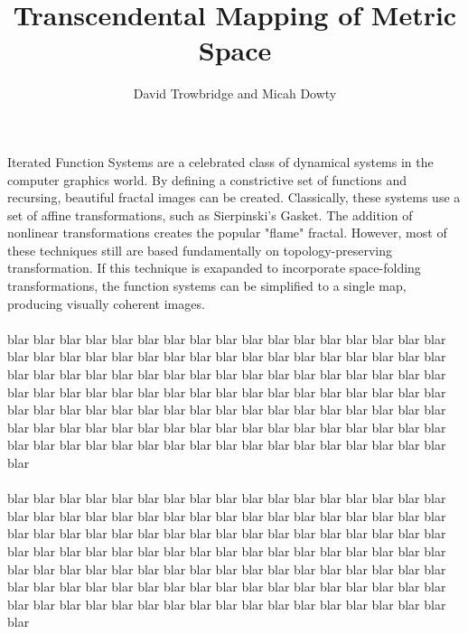 \documentclass[twocolumn]{article}
\title{Transcendental Mapping of Metric Space}
\author{David Trowbridge and Micah Dowty}
\begin{document}
\maketitle

\paragraph*{}
Iterated Function Systems are a celebrated class of dynamical systems in the
computer graphics world. By defining a constrictive set of functions and
recursing, beautiful fractal images can be created. Classically, these
systems use a set of affine transformations, such as Sierpinski's Gasket.
The addition of nonlinear transformations creates the popular "flame"
fractal. However, most of these techniques still are based fundamentally
on topology-preserving transformation. If this technique is exapanded to
incorporate space-folding transformations, the function systems can be
simplified to a single map, producing visually coherent images.

\paragraph*{}
blar blar blar blar blar blar blar blar blar blar blar blar blar blar blar
blar blar blar blar blar blar blar blar blar blar blar blar blar blar blar
blar blar blar blar blar blar blar blar blar blar blar blar blar blar blar
blar blar blar blar blar blar blar blar blar blar blar blar blar blar blar
blar blar blar blar blar blar blar blar blar blar blar blar blar blar blar
blar blar blar blar blar blar blar blar blar blar blar blar blar blar blar
blar blar blar blar blar blar blar blar blar blar blar blar blar blar blar
blar blar blar blar blar blar blar blar blar blar blar blar blar blar blar

\paragraph*{}
blar blar blar blar blar blar blar blar blar blar blar blar blar blar blar
blar blar blar blar blar blar blar blar blar blar blar blar blar blar blar
blar blar blar blar blar blar blar blar blar blar blar blar blar blar blar
blar blar blar blar blar blar blar blar blar blar blar blar blar blar blar
blar blar blar blar blar blar blar blar blar blar blar blar blar blar blar
blar blar blar blar blar blar blar blar blar blar blar blar blar blar blar
blar blar blar blar blar blar blar blar blar blar blar blar blar blar blar
blar blar blar blar blar blar blar blar blar blar blar blar blar blar blar
\end{document}

